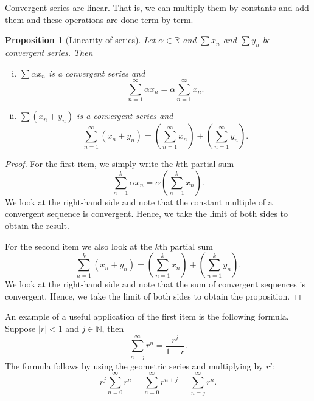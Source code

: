 \documentclass[12pt]{book}
\newcommand{\abs}[1]{\left\lvert {#1} \right\rvert}
\newcommand{\R}{{\mathbb{R}}}
\newcommand{\N}{{\mathbb{N}}}
\theoremstyle{plain}
\newtheorem{prop}[thm]{Proposition}
\theoremstyle{remark}
\theoremstyle{definition}
\theoremstyle{exercise}
\theoremstyle{example}
\begin{document}
Convergent series are linear.  That is, we can multiply them by constants
and add them and these operations are done term by term.

\begin{prop}[Linearity of series]
Let $\alpha \in \R$ and $\sum x_n$ and $\sum y_n$ be
convergent series.  Then
\begin{enumerate}[(i)]
\item
$\sum \alpha x_n$ is a convergent series and
\begin{equation*}
\sum_{n=1}^\infty \alpha x_n
=
\alpha \sum_{n=1}^\infty x_n .
\end{equation*}
\item
$\sum ( x_n + y_n )$ is a convergent series and
\begin{equation*}
\sum_{n=1}^\infty ( x_n + y_n ) 
=
\left( \sum_{n=1}^\infty x_n \right)
+
\left( \sum_{n=1}^\infty y_n \right) .
\end{equation*}
\end{enumerate}
\end{prop}

\begin{proof}
For the first item,
we simply write the $k$th partial sum
\begin{equation*}
\sum_{n=1}^k \alpha x_n
=
\alpha \left( \sum_{n=1}^k x_n \right) .
\end{equation*}
We look at the right-hand side and note that the constant multiple of
a convergent sequence
is convergent.  Hence, we take the limit of both sides to obtain
the result.

For the second item we also look at the
$k$th partial sum
\begin{equation*}
\sum_{n=1}^k ( x_n + y_n ) 
=
\left( \sum_{n=1}^k x_n \right)
+
\left( \sum_{n=1}^k y_n \right) .
\end{equation*}
We look at the right-hand side and note that the sum of convergent sequences
is convergent.  Hence, we take the limit of both sides to obtain
the proposition.
\end{proof}

An example of a useful application of the first item is the following
formula.  Suppose $\abs{r} < 1$ and $j \in \N$, then
\begin{equation*}
\sum_{n=j}^\infty r^n = \frac{r^j}{1-r} .
\end{equation*}
The formula follows by using the geometric series and multiplying by
$r^j$:
\begin{equation*}
r^j \sum_{n=0}^\infty r^n =
\sum_{n=0}^\infty r^{n+j}
=
\sum_{n=j}^\infty r^n .
\end{equation*}
\end{document}
